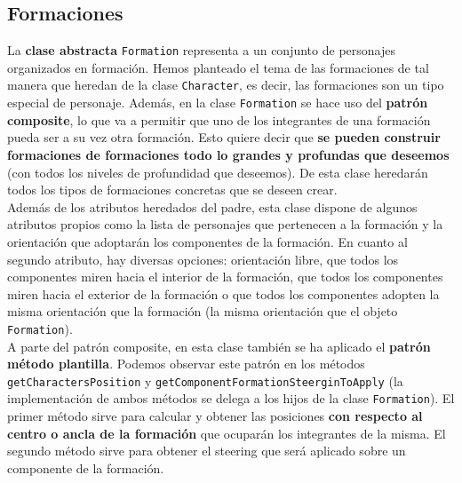\subsection{Formaciones}

La \textbf{clase abstracta} \texttt{Formation} representa a un conjunto de personajes organizados en formación. Hemos planteado el tema de las formaciones de tal manera que heredan de la clase \texttt{Character}, es decir, las formaciones son un tipo especial de personaje. Además, en la clase \texttt{Formation} se hace uso del \textbf{patrón composite}, lo que va a permitir que uno de los integrantes de una formación pueda ser a su vez otra formación. Esto quiere decir que \textbf{se pueden construir formaciones de formaciones todo lo grandes y profundas que deseemos} (con todos los niveles de profundidad que deseemos). De esta clase heredarán todos los tipos de formaciones concretas que se deseen crear. \\

Además de los atributos heredados del padre, esta clase dispone de algunos atributos propios como la lista de personajes que pertenecen a la formación y la orientación que adoptarán los componentes de la formación. En cuanto al segundo atributo, hay diversas opciones: orientación libre, que todos los componentes miren hacia el interior de la formación, que todos los componentes miren hacia el exterior de la formación o que todos los componentes adopten la misma orientación que la formación (la misma orientación que el objeto \texttt{Formation}). \\

A parte del patrón composite, en esta clase también se ha aplicado el \textbf{patrón método plantilla}. Podemos observar este patrón en los métodos \texttt{getCharactersPosition} y \texttt{getComponentFormationSteerginToApply} (la implementación de ambos métodos se delega a los hijos de la clase \texttt{Formation}). El primer método sirve para calcular y obtener las posiciones \textbf{con respecto al centro o ancla de la formación} que ocuparán los integrantes de la misma. El segundo método sirve para obtener el steering que será aplicado sobre un componente de la formación. \\


